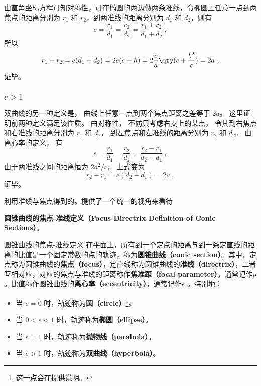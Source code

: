 由直角坐标方程可知对称性，可在椭圆的两边做两条准线，令椭圆上任意一点到两焦点的距离分别为 $r_1$ 和 $r_2$，到两准线的距离分别为 $d_1$ 和 $d_2$，则有
\begin{equation}
e = \frac{r_1}{d_1} = \frac{r_2}{d_2} = \frac{r_1 + r_2}{d_1 + d_2}~,
\end{equation}
所以
\begin{equation}
r_1 + r_2 = e(d_1+d_2) = 2e(c + h) = 2\frac{c}{a} \qty( c + \frac{b^2}{c} ) = 2a~,
\end{equation}
证毕。
\subsubsection{$e>1$}
双曲线的另一种定义是， 曲线上任意一点到两个焦点距离之差等于 $2a$。 这里证明前两种定义满足该性质。 由对称性， 不妨只考虑右支上的某点， 令其到右焦点和右准线的距离分别为 $r_1$ 和 $d_1$， 到左焦点和左准线的距离分别为 $r_2$ 和 $d_2$。 由离心率的定义， 有
\begin{equation}
e = \frac{r_1}{d_1} = \frac{r_2}{d_2} = \frac{r_2 - r_1}{d_2 - d_1}~,
\end{equation}
由于两准线之间的距离恒为 $2a^2/c$， 上式变为
\begin{equation}
r_2 - r_1 = e(d_2 - d_1) = 2a~,
\end{equation}
证毕。





利用准线与焦点得到的。提供了一个统一的视角来看待



\textbf{圆锥曲线的焦点-准线定义（Focus-Directrix Definition of Conic Sections）}。

\begin{definition}{圆锥曲线的焦点-准线定义}\label{def_HsCsFD_1}
在平面上，所有到一个定点的距离与到一条定直线的距离的比值是一个固定常数的点的轨迹，称为\textbf{圆锥曲线（conic section）}。其中，定点称为圆锥曲线的\textbf{焦点（focus）}，定直线称为圆锥曲线的\textbf{准线（directrix）}，二者互相对应，对应的焦点与准线的距离称作\textbf{焦准距（focal parameter）}，通常记作$p$。比值称作圆锥曲线的\textbf{离心率（eccentricity）}，通常记作$e$ 。特别地：
\begin{itemize}
\item 当 $e = 0$ 时，轨迹称为\textbf{圆（circle）}\footnote{这一点会在提供说明。}。
\item 当 $0 < e < 1$ 时，轨迹称为\textbf{椭圆（ellipse）}。
\item 当 $e = 1$ 时，轨迹称为\textbf{抛物线（parabola）}。
\item 当 $e > 1$ 时，轨迹称为\textbf{双曲线（hyperbola）}。
\end{itemize}
\end{definition}


